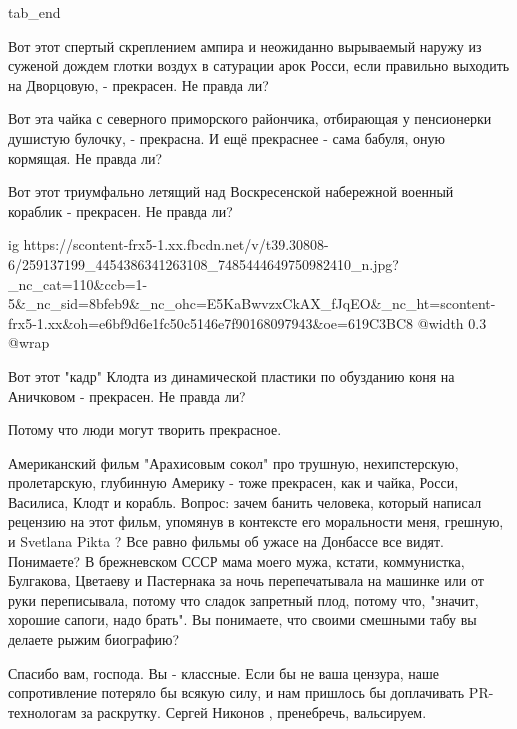   tab_end
\fi

Вот этот спертый скреплением ампира и неожиданно вырываемый наружу из суженой
дождем глотки воздух в сатурации арок Росси, если правильно выходить на
Дворцовую, - прекрасен. Не правда ли? 

Вот эта чайка с северного приморского райончика, отбирающая у пенсионерки
душистую булочку, - прекрасна. И ещё прекраснее - сама бабуля, оную кормящая.
Не правда ли?  

Вот этот триумфально летящий над Воскресенской набережной военный кораблик -
прекрасен. Не правда ли?

\ifcmt
  ig https://scontent-frx5-1.xx.fbcdn.net/v/t39.30808-6/259137199_4454386341263108_7485444649750982410_n.jpg?_nc_cat=110&ccb=1-5&_nc_sid=8bfeb9&_nc_ohc=E5KaBwvzxCkAX_fJqEO&_nc_ht=scontent-frx5-1.xx&oh=e6bf9d6e1fc50c5146e7f90168097943&oe=619C3BC8
  @width 0.3
  @wrap 
\fi

Вот этот "кадр" Клодта из динамической пластики по обузданию коня на Аничковом
- прекрасен. Не правда ли?

Потому что люди могут творить прекрасное.

Американский фильм "Арахисовым сокол" про трушную, нехипстерскую, пролетарскую,
глубинную Америку - тоже прекрасен, как и чайка, Росси, Василиса, Клодт и
корабль. Вопрос: зачем банить человека, который написал рецензию на этот фильм,
упомянув в контексте его моральности меня, грешную, и Svetlana Pikta ? Все
равно фильмы об ужасе на Донбассе все видят. Понимаете? В брежневском СССР мама
моего мужа, кстати, коммунистка, Булгакова, Цветаеву и Пастернака за ночь
перепечатывала на машинке или от руки переписывала, потому что сладок запретный
плод, потому что, "значит, хорошие сапоги, надо брать". Вы понимаете, что
своими смешными табу вы делаете рыжим биографию?

Спасибо вам, господа. Вы - классные. Если бы не ваша цензура, наше
сопротивление потеряло бы всякую силу, и нам пришлось бы доплачивать
PR-технологам за раскрутку. Сергей Никонов , пренебречь, вальсируем.

